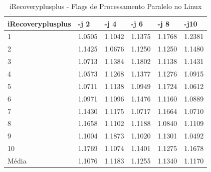 \begin{table}[!ht]
\centering
\caption{iRecoveryplusplus - Flags de Processamento Paralelo no Linux}
\label{tab:flag_processamento_paralelo:linux:irecoveryplusplus}
\begin{tabular}{llllll}
\textbf{iRecoveryplusplus} & \textbf{-j 2} & \textbf{-j 4} & \textbf{-j 6} & \textbf{-j 8} & \textbf{-j10}  \\ \toprule
1                          & 1.0505        &  1.1042       &  1.1375       &  1.1768       &  1.2381        \\ 
2                          & 1.1425        &  1.0676       &  1.1250       &  1.1250       &  1.1480        \\ 
3                          & 1.0713        &  1.1384       &  1.1802       &  1.1138       &  1.1431        \\ 
4                          & 1.0573        &  1.1268       &  1.1377       &  1.1276       &  1.0915        \\ 
5                          & 1.0711        &  1.1138       &  1.0949       &  1.1724       &  1.0612        \\ 
6                          & 1.0971        &  1.1096       &  1.1476       &  1.1160       &  1.0889        \\ 
7                          & 1.1430        &  1.1175       &  1.0717       &  1.1664       &  1.0710        \\ 
8                          & 1.1658        &  1.1102       &  1.1188       &  1.0840       &  1.1109        \\ 
9                          & 1.1004        &  1.1873       &  1.1020       &  1.1301       &  1.0492        \\ 
10                         & 1.1769        &  1.1074       &  1.1401       &  1.1275       &  1.1678        \\ \bottomrule
Média                      & 1.1076        &  1.1183       &  1.1255       &  1.1340       &  1.1170        \\ 
\end{tabular}
\end{table}

